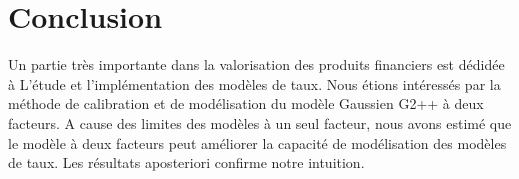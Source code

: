 \chapter{Conclusion}

Un partie très importante dans la valorisation des produits financiers est dédidée à L’étude et l’implémentation des modèles de taux.
Nous étions intéressés par la méthode de calibration et de modélisation du modèle Gaussien G2++ à deux facteurs. A cause des limites des modèles à un seul facteur, nous avons estimé que le modèle à deux facteurs peut améliorer la capacité de modélisation des modèles de taux.
Les résultats aposteriori confirme notre intuition.


